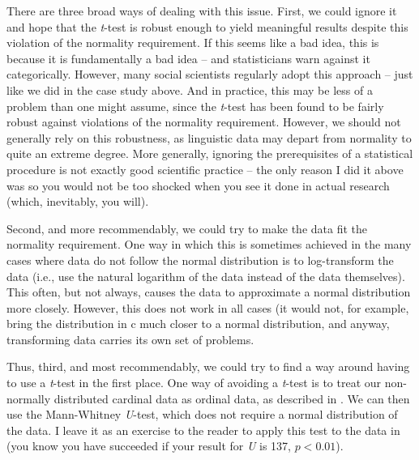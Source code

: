 There are three broad ways of dealing with this issue. First, we could ignore it and hope that the \textit{t}-test  is robust enough to yield meaningful results despite this violation of the normality requirement. If this seems like a bad idea, this is because it is fundamentally a bad idea -- and statisticians warn against it categorically.  However, many social scientists regularly adopt this approach -- just like we did in the case study above. And in practice, this may be less of a problem than one might assume, since the \textit{t}-test  has been found to be fairly robust against violations of the normality requirement. However, we should not generally rely on this robustness, as linguistic data may depart from normality to quite an extreme degree. More generally, ignoring the prerequisites of a statistical procedure is not exactly good scientific practice -- the only reason I did it above was so you would not be too shocked when you see it done in actual research (which, inevitably, you will).

Second, and more recommendably, we could try to make the data fit the normality requirement. One way in which this is sometimes achieved in the many cases where data do not follow the normal distribution  is to log\hyp{}transform the data (i.e., use the natural logarithm  of the data instead of the data themselves). This often, but not always, causes the data to approximate a normal distribution more closely. However, this does not work in all cases (it would not, for example, bring the distribution in c much closer to a normal distribution, and anyway, transforming data carries its own set of problems.

Thus, third, and most recommendably, we could try to find a way around having to use a \textit{t}-test  in the first place. One way of avoiding a \textit{t}-test is to treat our non\hyp{}normally distributed  cardinal  data as ordinal  data, as described in . We can then use the Mann\hyp{}Whitney  \textit{U}\hyp{}test, which does not require a normal distribution of the data. I leave it as an exercise to the reader to apply this test to the data in  (you know you have succeeded if your result for \textit{U} is 137, $p < 0.01$).


